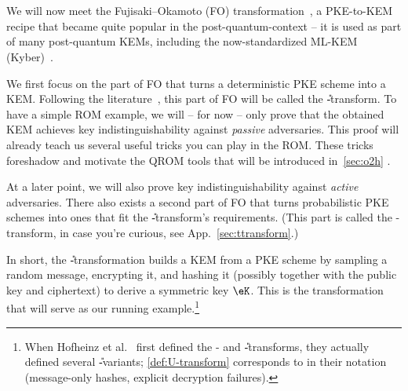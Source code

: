 \section{\titleUtransformRom}\label{sec:utransform}
  
  We will now meet the Fujisaki--Okamoto (FO) transformation~\cite{C:FujOka99},
  	a PKE-to-KEM recipe that became quite popular in the post-quantum-context --
  	it is used as part of many post-quantum KEMs,
  	including the now-standardized ML-KEM (Kyber)~\cite{FIPS203}. 
  
  We first focus on the part of FO that turns a deterministic PKE scheme into a KEM.
	  Following the literature~\cite{TCC:HofHovKil17}, this part of FO will be called the \U-transform.
	  To have a simple ROM example, we will -- for now -- only prove that the obtained KEM
	  achieves key indistinguishability against \emph{passive} adversaries.
	  This proof will already teach us several useful tricks you can play in the ROM.
	  These tricks foreshadow and motivate the QROM tools that will be introduced in~\cref{sec:o2h}
	  .

  At a later point,
    we will also prove key indistinguishability against \emph{active} adversaries.
    There also exists a second part of FO that turns probabilistic PKE schemes
    into ones that fit the \U-transform's requirements.
    (This part is called the \T-transform, in case you're curious, see App.~\ref{sec:ttransform}.)

  In short, the \U-transformation builds a KEM from a PKE scheme by sampling a random message,
    encrypting it, and hashing it (possibly together with the public key and ciphertext) to derive a
    symmetric key $\eK$. This is the transformation that will serve as our
    running example.\footnote{
      When Hofheinz et al.~\cite{TCC:HofHovKil17} first defined
      the \T- and \U-transforms, they actually defined several \U-variants;
      \cref{def:U-transform} corresponds to
      \UExpMess in their notation (message-only hashes, explicit decryption failures).
    }

